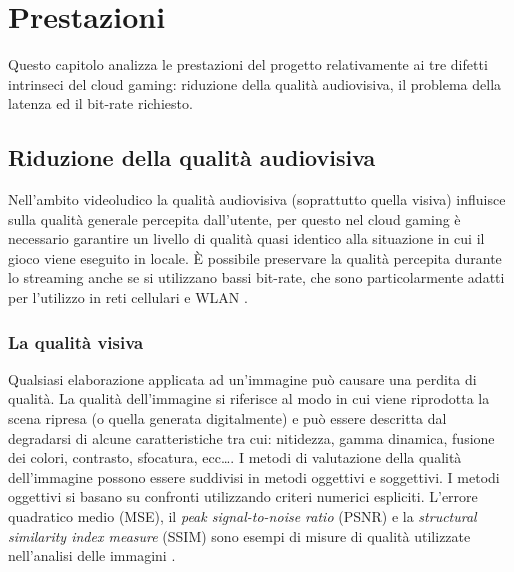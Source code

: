 %
%

\chapter{Prestazioni} \label{cap:cap4}
Questo capitolo analizza le prestazioni del progetto relativamente ai tre difetti intrinseci del cloud gaming: riduzione della qualità audiovisiva, il problema della latenza ed il bit-rate richiesto.



\section{Riduzione della qualità audiovisiva}
Nell'ambito videoludico la qualità audiovisiva (soprattutto quella visiva) influisce sulla qualità generale percepita dall'utente, per questo nel cloud gaming è necessario garantire un livello di qualità quasi identico alla situazione in cui il gioco viene eseguito in locale. È possibile preservare la qualità percepita durante lo streaming anche se si utilizzano bassi bit-rate, che sono particolarmente adatti per l'utilizzo in reti cellulari e WLAN \parencite{VideoAndMultimediaTransmissionsOverCellularNetworks}.



\subsection{La qualità visiva}
Qualsiasi elaborazione applicata ad un'immagine può causare una perdita di qualità. La qualità dell'immagine si riferisce al modo in cui viene riprodotta la scena ripresa (o quella generata digitalmente) e può essere descritta dal degradarsi di alcune caratteristiche tra cui: nitidezza, gamma dinamica, fusione dei colori, contrasto, sfocatura, ecc\dots. I metodi di valutazione della qualità dell'immagine possono essere suddivisi in metodi oggettivi e soggettivi. I metodi oggettivi si basano su confronti utilizzando criteri numerici espliciti. L'errore quadratico medio (MSE), il \textit{peak signal-to-noise ratio} (PSNR) e la \textit{structural similarity index measure} (SSIM) sono esempi di misure di qualità utilizzate nell'analisi delle immagini \parencite{relationship_PSNR_and_SSI}.



